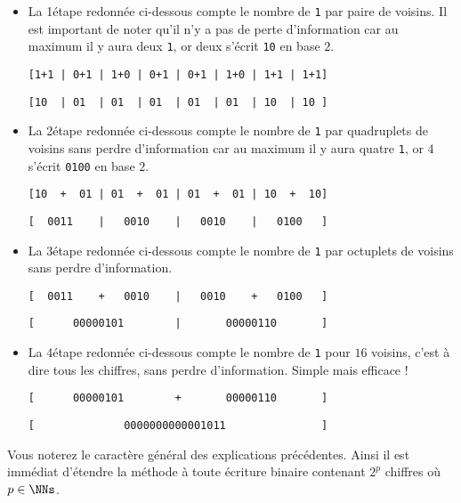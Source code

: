 \documentclass[12pt]{amsart}
\begin{document}
\begin{itemize}[label=\small\textbullet]
	\item La 1\iere étape redonnée ci-dessous compte le nombre de \verb+1+ par paire de voisins.
	Il est important de noter qu'il n'y a pas de perte d'information car au maximum il y aura deux \verb+1+, or deux s'écrit \verb+10+ en base $2$.

	\begin{center}
	\verb-[1+1 | 0+1 | 1+0 | 0+1 | 0+1 | 1+0 | 1+1 | 1+1]-

	\verb-[10  | 01  | 01  | 01  | 01  | 01  | 10  | 10 ]-
	\end{center}


	\item La 2\ieme étape redonnée ci-dessous compte le nombre de \verb+1+ par quadruplets de voisins sans perdre d'information car au maximum il y aura quatre \verb+1+, or $4$ s'écrit \verb+0100+ en base $2$.

	\begin{center}
	\verb-[10  +  01 | 01  +  01 | 01  +  01 | 10  +  10]-

	\verb-[  0011    |   0010    |   0010    |   0100   ]-
	\end{center}


	\item La 3\ieme étape redonnée ci-dessous compte le nombre de \verb+1+ par octuplets de voisins sans perdre d'information.

	\begin{center}
	\verb-[  0011    +   0010    |   0010    +   0100   ]-

	\verb-[      00000101        |       00000110       ]-
	\end{center}


	\item La 4\ieme étape redonnée ci-dessous compte le nombre de \verb+1+ pour $16$ voisins, c'est à dire tous les chiffres, sans perdre d'information. Simple mais efficace !

	\begin{center}
	\verb-[      00000101        +       00000110       ]-

	\verb-[              0000000000001011               ]-
	\end{center}
\end{itemize}

Vous noterez le caractère général des explications précédentes.
Ainsi il est immédiat d'étendre la méthode à toute écriture binaire contenant $2^p$ chiffres où $p\in\NNs$.
\end{document}
